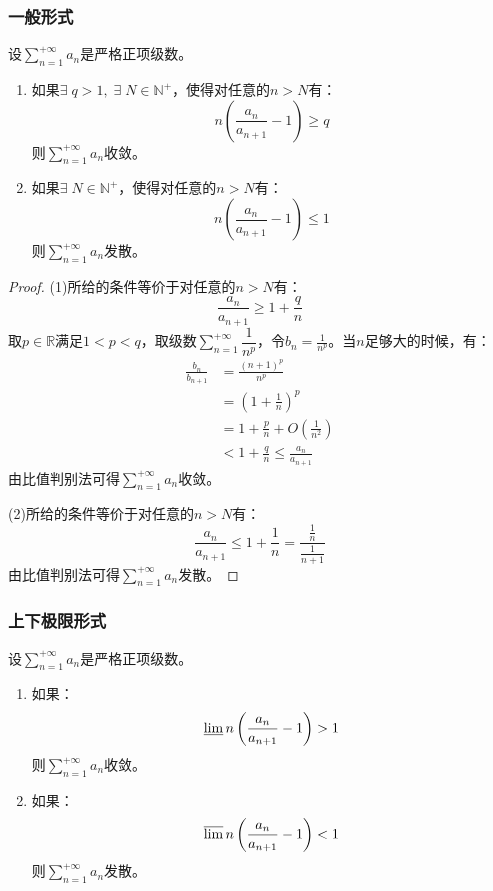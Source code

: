 \subsubsection{一般形式}
\begin{theorem}
	设$\sum\limits_{n=1}^{+\infty}a_n$是严格正项级数。
	\begin{enumerate}
		\item  如果$\exists\;q>1,\;\exists\;N\in\mathbb{N}^+$，使得对任意的$n>N$有：
		\begin{equation*}
			n\left(\frac{a_n}{a_{n+1}}-1\right)\geqslant q
		\end{equation*}
		则$\sum\limits_{n=1}^{+\infty}a_n$收敛。
		\item  如果$\exists\;N\in\mathbb{N}^+$，使得对任意的$n>N$有：
		\begin{equation*}
			n\left(\frac{a_n}{a_{n+1}}-1\right)\leqslant1
		\end{equation*}
		则$\sum\limits_{n=1}^{+\infty}a_n$发散。
	\end{enumerate}
\end{theorem}
\begin{proof}
	(1)所给的条件等价于对任意的$n>N$有：
	\begin{equation*}
		\frac{a_n}{a_{n+1}}\geqslant1+\frac{q}{n}
	\end{equation*}
	取$p\in\mathbb{R}$满足$1<p<q$，取级数$\sum\limits_{n=1}^{+\infty}\dfrac{1}{n^p}$，令$b_n=\frac{1}{n^p}$。当$n$足够大的时候，有：
	\begin{align*}
		\frac{b_n}{b_{n+1}}&=\frac{(n+1)^p}{n^p} \\
		&=(1+\frac{1}{n})^p \\
		&=1+\frac{p}{n}+O(\frac{1}{n^2}) \\
		&<1+\frac{q}{n}\leqslant\frac{a_n}{a_{n+1}}
	\end{align*}
	由比值判别法可得$\sum\limits_{n=1}^{+\infty}a_n$收敛。\par
	(2)所给的条件等价于对任意的$n>N$有：
	\begin{equation*}
		\frac{a_n}{a_{n+1}}\leqslant1+\frac{1}{n}=\frac{\frac{1}{n}}{\frac{1}{n+1}}
	\end{equation*}
	由比值判别法可得$\sum\limits_{n=1}^{+\infty}a_n$发散。
\end{proof}
\subsubsection{上下极限形式}
\begin{theorem}
	设$\sum\limits_{n=1}^{+\infty}a_n$是严格正项级数。
	\begin{enumerate}
		\item 如果：
		\begin{equation*}
			\varliminf n\left(\frac{a_{n}}{a_{n+1}}-1\right)>1
		\end{equation*}
		则$\sum\limits_{n=1}^{+\infty}a_n$收敛。
		\item 如果：
		\begin{equation*}
			\varlimsup n\left(\frac{a_{n}}{a_{n+1}}-1\right)<1
		\end{equation*}
		则$\sum\limits_{n=1}^{+\infty}a_n$发散。
	\end{enumerate}
\end{theorem}

